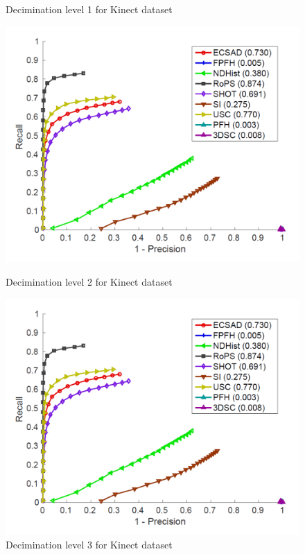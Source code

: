 \documentclass[10pt,twocolumn,letterpaper]{article}
\begin{document}
\begin{figure}[htp]
\begin{minipage}[b]{.3\textwidth}
\caption{Decimination level 1 for Kinect dataset}\label{fig:kinect_d1}
\end{minipage}\qquad
\begin{minipage}[b]{.3\textwidth}
\includegraphics[width=1.0\linewidth, height= 1.0\linewidth, keepaspectratio]{img/PRC_1.pdf}
\caption{Decimination level 2 for Kinect dataset}\label{fig:kinect_d2}
\end{minipage}
\begin{minipage}[b]{.3\textwidth}
\includegraphics[width=1.0\linewidth, height= 1.0\linewidth, keepaspectratio]{img/PRC_1.pdf}
\caption{Decimination level 3 for Kinect dataset}\label{fig:kinect_d3}
\end{minipage}
\end{figure}
\end{document}
